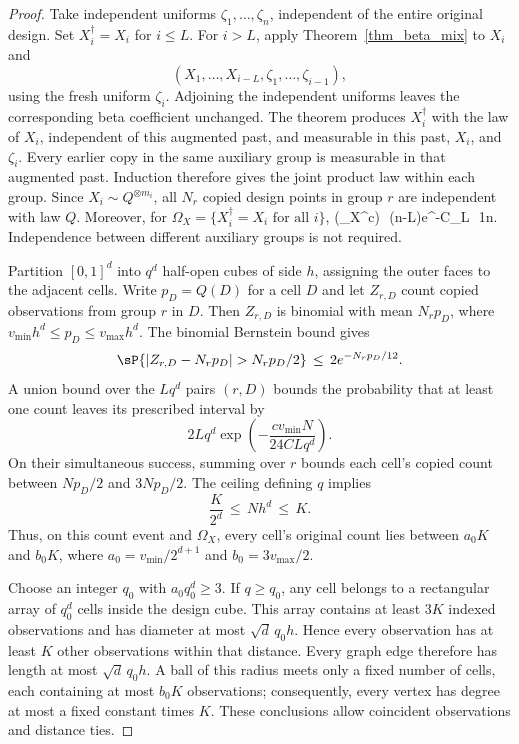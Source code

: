 \documentclass[twoside,11pt]{article}
\newenvironment{revision}{\color{revisionred}}{}
\begin{document}
\begin{revision}
\begin{proof}
Take independent uniforms $\zeta_1,\ldots,\zeta_n$, independent of the entire original design. Set $X_i^\dagger=X_i$ for $i\leq L$. For $i>L$, apply Theorem~\ref{thm_beta_mix} to $X_i$ and
\[
(X_1,\ldots,X_{i-L},\zeta_1,\ldots,\zeta_{i-1}),
\]
using the fresh uniform $\zeta_i$. Adjoining the independent uniforms leaves the corresponding beta coefficient unchanged. The theorem produces $X_i^\dagger$ with the law of $X_i$, independent of this augmented past, and measurable in this past, $X_i$, and $\zeta_i$. Every earlier copy in the same auxiliary group is measurable in that augmented past. Induction therefore gives the joint product law within each group. Since $X_i\sim Q^{\otimes m_i}$, all $N_r$ copied design points in group $r$ are independent with law $Q$. Moreover, for
$\Omega_X=\{X_i^\dagger=X_i\text{ for all }i\}$,
\beq
\label{eq_knn_bv_design_match}
\sP(\Omega_X^c)
\,\leq\,(n-L)e^{-C_\beta L}
\,\leq\,\frac1n.
\beq
Independence between different auxiliary groups is not required.

Partition $[0,1]^d$ into $q^d$ half-open cubes of side $h$, assigning the outer faces to the adjacent cells. Write $p_D=Q(D)$ for a cell $D$ and let $Z_{r,D}$ count copied observations from group $r$ in $D$. Then $Z_{r,D}$ is binomial with mean $N_rp_D$, where
$v_{\min}h^d\leq p_D\leq v_{\max}h^d$. The binomial Bernstein bound gives
\[
\sP\{|Z_{r,D}-N_rp_D|>N_rp_D/2\}
\,\leq\,2e^{-N_rp_D/12}.
\]
A union bound over the $Lq^d$ pairs $(r,D)$ bounds the probability that at least one count leaves its prescribed interval by
\[
2Lq^d\exp\left(-\frac{cv_{\min}N}{24CLq^d}\right).
\]
On their simultaneous success, summing over $r$ bounds each cell's copied count between $Np_D/2$ and $3Np_D/2$. The ceiling defining $q$ implies
\[
\frac K{2^d}\,\leq\,Nh^d\,\leq\,K.
\]
Thus, on this count event and $\Omega_X$, every cell's original count lies between $a_0K$ and $b_0K$, where
$a_0=v_{\min}/2^{d+1}$ and $b_0=3v_{\max}/2$.

Choose an integer $q_0$ with $a_0q_0^d\geq3$. If $q\geq q_0$, any cell belongs to a rectangular array of $q_0^d$ cells inside the design cube. This array contains at least $3K$ indexed observations and has diameter at most $\sqrt d\,q_0h$. Hence every observation has at least $K$ other observations within that distance. Every graph edge therefore has length at most $\sqrt d\,q_0h$. A ball of this radius meets only a fixed number of cells, each containing at most $b_0K$ observations; consequently, every vertex has degree at most a fixed constant times $K$. These conclusions allow coincident observations and distance ties.


\end{proof}
\end{revision}
\end{document}
